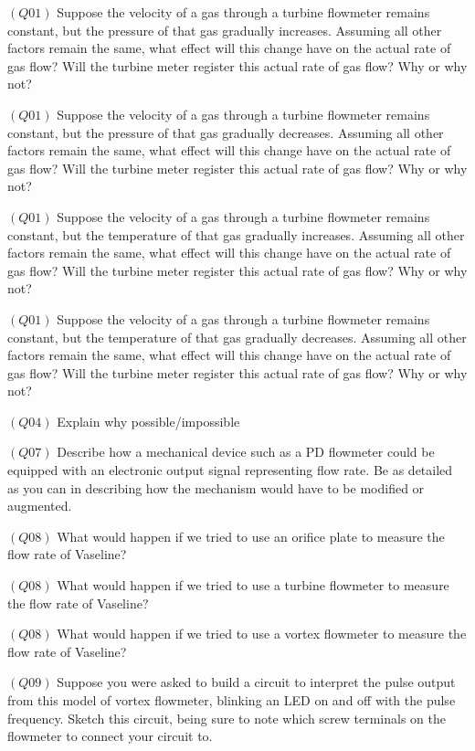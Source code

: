\medskip
\item{$(Q01)$} Suppose the velocity of a gas through a turbine flowmeter remains constant, but the pressure of that gas gradually increases.  Assuming all other factors remain the same, what effect will this change have on the actual rate of gas flow?  Will the turbine meter register this actual rate of gas flow?  Why or why not?
\item{$(Q01)$} Suppose the velocity of a gas through a turbine flowmeter remains constant, but the pressure of that gas gradually decreases.  Assuming all other factors remain the same, what effect will this change have on the actual rate of gas flow?  Will the turbine meter register this actual rate of gas flow?  Why or why not?
\item{$(Q01)$} Suppose the velocity of a gas through a turbine flowmeter remains constant, but the temperature of that gas gradually increases.  Assuming all other factors remain the same, what effect will this change have on the actual rate of gas flow?  Will the turbine meter register this actual rate of gas flow?  Why or why not?
\item{$(Q01)$} Suppose the velocity of a gas through a turbine flowmeter remains constant, but the temperature of that gas gradually decreases.  Assuming all other factors remain the same, what effect will this change have on the actual rate of gas flow?  Will the turbine meter register this actual rate of gas flow?  Why or why not?
\item{$(Q04)$} Explain why possible/impossible
\item{$(Q07)$} Describe how a mechanical device such as a PD flowmeter could be equipped with an electronic output signal representing flow rate.  Be as detailed as you can in describing how the mechanism would have to be modified or augmented.
\item{$(Q08)$} What would happen if we tried to use an orifice plate to measure the flow rate of Vaseline?
\item{$(Q08)$} What would happen if we tried to use a turbine flowmeter to measure the flow rate of Vaseline?
\item{$(Q08)$} What would happen if we tried to use a vortex flowmeter to measure the flow rate of Vaseline?
\item{$(Q09)$} Suppose you were asked to build a circuit to interpret the pulse output from this model of vortex flowmeter, blinking an LED on and off with the pulse frequency.  Sketch this circuit, being sure to note which screw terminals on the flowmeter to connect your circuit to.
\medskip


